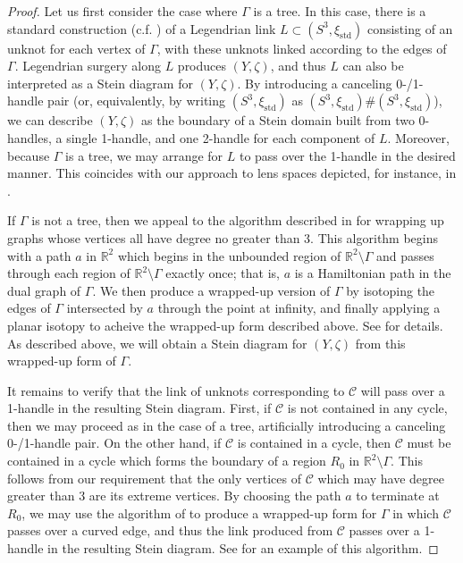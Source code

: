 \documentclass[11pt]{amsart}
\numberwithin{equation}{section}
\theoremstyle{plain}
\theoremstyle{definition}
\theoremstyle{remark}\newtheorem{rem}[equation]{Remark}%
\theoremstyle{remark}\newtheorem{obs}[equation]{Observation}%
\begin{document}
\begin{proof}
Let us first consider the case where $\Gamma$ is a tree.  In this case, there is a standard construction (c.f. \cite[Section 4.6]{gompf20234}) of a Legendrian link $L\subset(S^3,\xi_{\mathrm{std}})$ consisting of an unknot for each vertex of $\Gamma$, with these unknots linked according to the edges of $\Gamma$.  Legendrian surgery along $L$ produces $(Y,\zeta)$, and thus $L$ can also be interpreted as a Stein diagram for $(Y,\zeta)$.  By introducing a canceling 0-/1-handle pair (or, equivalently, by writing $(S^3,\xi_{\mathrm{std}})$ as $(S^3,\xi_{\mathrm{std}})\#(S^3,\xi_{\mathrm{std}})$), we can describe $(Y,\zeta)$ as the boundary of a Stein domain built from two 0-handles, a single 1-handle, and one 2-handle for each component of $L$.  Moreover, because $\Gamma$ is a tree, we may arrange for $L$ to pass over the 1-handle in the desired manner.  This coincides with our approach to lens spaces depicted, for instance, in .

If $\Gamma$ is not a tree, then we appeal to the algorithm described in \cite[Section 5]{shah2024tight} for wrapping up graphs whose vertices all have degree no greater than 3.  This algorithm begins with a path $a$ in $\mathbb{R}^2$ which begins in the unbounded region of $\mathbb{R}^2\setminus\Gamma$ and passes through each region of $\mathbb{R}^2\setminus\Gamma$ exactly once; that is, $a$ is a Hamiltonian path in the dual graph of $\Gamma$.  We then produce a wrapped-up version of $\Gamma$ by isotoping the edges of $\Gamma$ intersected by $a$ through the point at infinity, and finally applying a planar isotopy to acheive the wrapped-up form described above.  See \cite[Lemma 17]{shah2024tight} for details.  As described above, we will obtain a Stein diagram for $(Y,\zeta)$ from this wrapped-up form of $\Gamma$.

It remains to verify that the link of unknots corresponding to $\mathcal{C}$ will pass over a 1-handle in the resulting Stein diagram.  First, if $\mathcal{C}$ is not contained in any cycle, then we may proceed as in the case of a tree, artificially introducing a canceling 0-/1-handle pair.  On the other hand, if $\mathcal{C}$ is contained in a cycle, then $\mathcal{C}$ must be contained in a cycle which forms the boundary of a region $R_0$ in $\mathbb{R}^2\setminus\Gamma$.  This follows from our requirement that the only vertices of $\mathcal{C}$ which may have degree greater than 3 are its extreme vertices.  By choosing the path $a$ to terminate at $R_0$, we may use the algorithm of \cite[Section 5]{shah2024tight} to produce a wrapped-up form for $\Gamma$ in which $\mathcal{C}$ passes over a curved edge, and thus the link produced from $\mathcal{C}$ passes over a 1-handle in the resulting Stein diagram.  See  for an example of this algorithm.
\end{proof}
\end{document}

